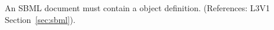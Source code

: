 An SBML document must contain a \Model object definition.  (References:
L3V1 Section~\ref{sec:sbml}).
